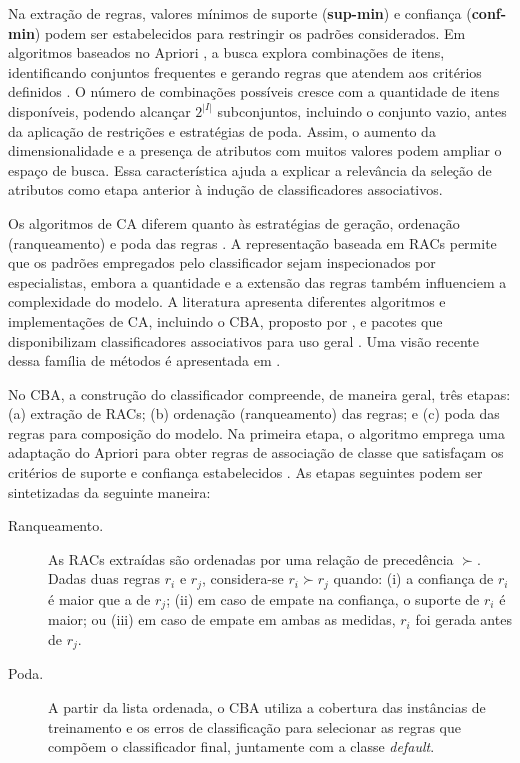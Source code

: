 Na extração de regras, valores mínimos de suporte (\textbf{sup-min}) e confiança (\textbf{conf-min}) podem ser estabelecidos para restringir os padrões considerados. Em algoritmos baseados no Apriori \cite{apriori}, a busca explora combinações de itens, identificando conjuntos frequentes e gerando regras que atendem aos critérios definidos \cite{agrawal1993mining,apriori}. O número de combinações possíveis cresce com a quantidade de itens disponíveis, podendo alcançar $2^{|I|}$ subconjuntos, incluindo o conjunto vazio, antes da aplicação de restrições e estratégias de poda. Assim, o aumento da dimensionalidade e a presença de atributos com muitos valores podem ampliar o espaço de busca. Essa característica ajuda a explicar a relevância da seleção de atributos como etapa anterior à indução de classificadores associativos.

Os algoritmos de CA diferem quanto às estratégias de geração, ordenação (ranqueamento) e poda das regras \cite{10.1016/j.eswa.2025.127454}. A representação baseada em RACs permite que os padrões empregados pelo classificador sejam inspecionados por especialistas, embora a quantidade e a extensão das regras também influenciem a complexidade do modelo. A literatura apresenta diferentes algoritmos e implementações de CA, incluindo o CBA, proposto por , e pacotes que disponibilizam classificadores associativos para uso geral \cite{Hahsler2019254,Padillo2020,10.1145/3419604.3419762}. Uma visão recente dessa família de métodos é apresentada em .

No CBA, a construção do classificador compreende, de maneira geral, três etapas: (a) extração de RACs; (b) ordenação (ranqueamento) das regras; e (c) poda das regras para composição do modelo. Na primeira etapa, o algoritmo emprega uma adaptação do Apriori para obter regras de associação de classe que satisfaçam os critérios de suporte e confiança estabelecidos \cite{liu1998}. As etapas seguintes podem ser sintetizadas da seguinte maneira:

\begin{description}
    \item[Ranqueamento.] As RACs extraídas são ordenadas por uma relação de precedência $\succ$. Dadas duas regras $r_i$ e $r_j$, considera-se $r_i \succ r_j$ quando: (i) a confiança de $r_i$ é maior que a de $r_j$; (ii) em caso de empate na confiança, o suporte de $r_i$ é maior; ou (iii) em caso de empate em ambas as medidas, $r_i$ foi gerada antes de $r_j$.

    \item[Poda.] A partir da lista ordenada, o CBA utiliza a cobertura das instâncias de treinamento e os erros de classificação para selecionar as regras que compõem o classificador final, juntamente com a classe \textit{default}.
\end{description}


